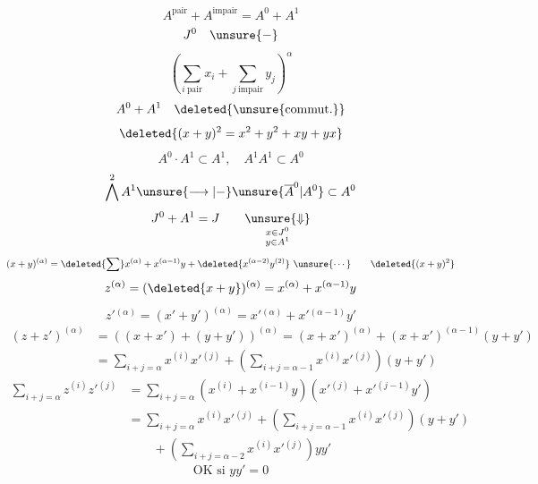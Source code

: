 {
\[
A^{\mathrm{pair}}+A^{\mathrm{impair}}=A^0+A^1
\]
\[
J^0\quad\unsure{-}
\]
\[
\left(\sum_{i\ \mathrm{pair}}x_i+\sum_{j\ \mathrm{impair}}y_j\right)^\alpha
\]
\[
A^0+A^1\quad\deleted{\unsure{\text{commut.}}}
\]
\[
\deleted{(x+y)^2=x^2+y^2+xy+yx}
\]
\[
A^0\cdot A^1\subset A^1,\quad A^1 A^1\subset A^0
\]
\[
\bigwedge^2 A^1\unsure{\longrightarrow|-}\unsure{\overline A^0|A^0}\subset A^0
\]
\[
J^0+A^1=J\qquad\underset{\substack{x\in J^0\\y\in A^1}}{\unsure{\Downarrow}}
\]
\[
(x+y)^{(\alpha)}=\deleted{\sum}x^{(\alpha)}+x^{(\alpha-1)}y+\deleted{x^{(\alpha-2)}y^{(2)}}\ \unsure{\cdots}\qquad\deleted{(x+y)^2}
\]
\[
z^{(\alpha)}=(\deleted{x+y})^{(\alpha)}=x^{(\alpha)}+x^{(\alpha-1)}y
\]
\[
z'{}^{(\alpha)}=(x'+y')^{(\alpha)}=x'{}^{(\alpha)}+x'{}^{(\alpha-1)}y'
\]
\[
\begin{aligned}
(z+z')^{(\alpha)}&=((x+x')+(y+y'))^{(\alpha)}=(x+x')^{(\alpha)}+(x+x')^{(\alpha-1)}(y+y')\\
&=\sum_{i+j=\alpha}x^{(i)}x'{}^{(j)}+\left(\sum_{i+j=\alpha-1}x^{(i)}x'{}^{(j)}\right)(y+y')
\end{aligned}
\]
\[
\begin{aligned}
\sum_{i+j=\alpha}z^{(i)}z'{}^{(j)}&=\sum_{i+j=\alpha}(x^{(i)}+x^{(i-1)}y)(x'{}^{(j)}+x'{}^{(j-1)}y')\\
&=\sum_{i+j=\alpha}x^{(i)}x'{}^{(j)}+\left(\sum_{i+j=\alpha-1}x^{(i)}x'{}^{(j)}\right)(y+y')\\
&\qquad+\left(\sum_{i+j=\alpha-2}x^{(i)}x'{}^{(j)}\right)yy'
\end{aligned}
\]
\[
\boxed{\text{OK si }yy'=0}
\]
}
